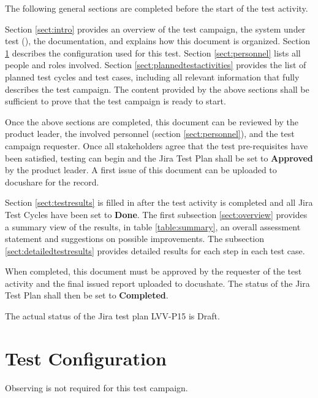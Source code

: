 \documentclass[DM,lsstdraft,STR,toc]{lsstdoc}
\begin{document}
The following general sections are completed before the start of the test activity.

Section \ref{sect:intro} provides an overview of the test campaign, the system under test (\product{}), the documentation, and explains how this document is organized.
Section \ref{sect:configuration}  describes the configuration used for this test.
Section \ref{sect:personnel} lists all people and roles involved.
Section \ref{sect:plannedtestactivities} provides the list of planned test cycles and test cases, including all relevant information that fully describes the test campaign.
The content provided by the above sections shall be sufficient to prove that the test campaign is ready to start.

Once the above sections are completed, this document can be reviewed by the product leader, the involved personnel (section \ref{sect:personnel}), and the test campaign requester.
Once all stakeholders agree that the test pre-requisites have been satisfied, testing can begin and the Jira Test Plan shall be set to {\bf Approved} by the \product{} product leader.
A first issue of this document can be uploaded to docushare for the record.

Section \ref{sect:testresults} is filled in after the test activity is completed and all Jira Test Cycles have been set to {\bf Done}.
The first subsection \ref{sect:overview} provides a summary view of the results, in table \ref{table:summary}, 
an overall assessment statement and suggestions on possible improvements.
The subsection \ref{sect:detailedtestresults} provides detailed results for each step in each test case.

When completed, this document must be approved by the requester of the test activity and
the final issued report uploaded to docushate. 
The status of the Jira Test Plan shall then be set to {\bf Completed}.

The actual status of the Jira test plan LVV-P15 is Draft.

\section{Test Configuration}
\label{sect:configuration}

Observing is not required for this test campaign.
\end{document}
